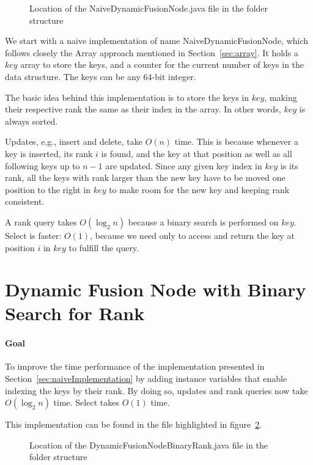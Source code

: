 \begin{figure}[H]
\caption{Location of the {\ttfamily NaiveDynamicFusionNode.java} file in the folder structure}
\label{fig:NaiveDynamicFusionNodeTree}
\end{figure}

We start with a naive implementation of name {\ttfamily NaiveDynamicFusionNode}, which follows closely the Array approach mentioned in Section~\ref{sec:array}.
It holds a $key$ array to store the keys, and a counter for the current number of keys in the data structure. The keys can be any 64-bit integer.

The basic idea behind this implementation is to store the keys in $key$, making their respective rank the same as their index in the array. In other words, $key$ is always sorted.

Updates, e.g., insert and delete, take $O(n)$ time. This is because whenever a key is inserted, its rank $i$ is found, and the key at that position as well as all following keys up to $n-1$ are updated. Since any given key index in $key$ is its rank, all the keys with rank larger than the new key have to be moved one position to the right in $key$ to make room for the new key and keeping rank consistent.

A rank query takes $O(\log_2 n)$ because a binary search is performed on $key$. Select is faster: $O(1)$, because we need only to access and return the key at position $i$ in $key$ to fulfill the query.

\newpage
\section{Dynamic Fusion Node with Binary Search for Rank} \label{sec:DynamicFusionNodeBinaryRank}

\paragraph*{Goal}
To improve the time performance of the implementation presented in Section~\ref{sec:naiveImplementation} by adding instance variables that enable indexing the keys by their rank. By doing so, updates and rank queries now take $O(\log_2 n)$ time. Select takes $O(1)$ time.

This implementation can be found in the file highlighted in figure~\ref{fig:DynamicFusionNodeBinaryRankTree}.
\begin{figure}[H]
\caption{Location of the {\ttfamily DynamicFusionNodeBinaryRank.java} file in the folder structure}
\label{fig:DynamicFusionNodeBinaryRankTree}
\end{figure}

